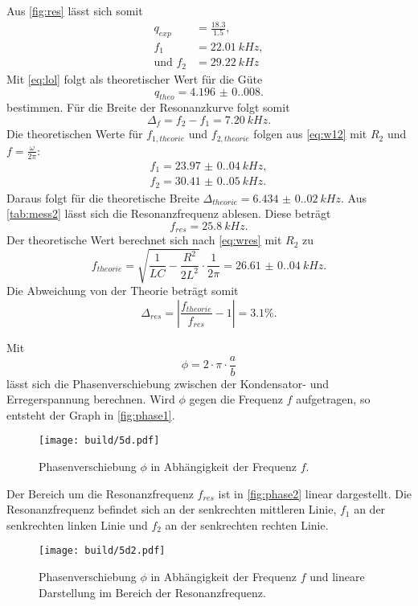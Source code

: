 Aus \autoref{fig:res} lässt sich somit
\begin{align*}
  q_{exp} &= \frac{18.3}{1.5}, \\
  f_1 &= \SI{22.01}{kHz}, \\
  \text{und } f_2 &= \SI{29.22}{kHz}
\end{align*}
Mit \autoref{eq:lol} folgt als theoretischer Wert für die Güte
\begin{equation*}
  q_{theo} = \SI{4.196(0.008)}.
\end{equation*}
bestimmen. Für die Breite der Resonanzkurve folgt somit
\begin{equation*}
  \Delta_f = f_2 - f_1 = \SI{7.20}{kHz}.
\end{equation*}
\newpage
Die theoretischen Werte für $f_{1, theorie}$ und $f_{2, theorie}$ folgen aus \autoref{eq:w12} mit $R_2$ und $f = \frac{\omega}{2\pi}$:
\begin{align*}
  f_1 = \SI{23.97(0.04)}{kHz},\\
  f_2 = \SI{30.41(0.05)}{kHz}.
\end{align*}
Daraus folgt für die theoretische Breite $\Delta_{theorie} = \SI{6.434(0.020)}{kHz}$.
Aus \autoref{tab:mess2} lässt sich die Resonanzfrequenz ablesen. Diese beträgt
\begin{equation*}
  f_{res} = \SI{25.8}{kHz}.
\end{equation*}
Der theoretische Wert berechnet sich nach \autoref{eq:wres} mit $R_2$ zu 
\begin{equation*}
  f_{theorie} = \sqrt{\frac{1}{LC} - \frac{R^2}{2L^2}} \cdot \frac{1}{2\pi} = \SI{26.61(0.04)}{kHz}.
\end{equation*}
Die Abweichung von der Theorie beträgt somit 
\begin{equation*}
  \Delta_{res} = |\frac{f_{theorie}}{f_{res}} - 1| = 3.1\%.
\end{equation*}

Mit 
\begin{equation*}
  \phi = 2 \cdot \pi \cdot \frac{a}{b}
\end{equation*}
lässt sich die Phasenverschiebung zwischen der Kondensator- und Erregerspannung berechnen.
Wird $\phi$ gegen die Frequenz $f$ aufgetragen, so entsteht der Graph in \autoref{fig:phase1}.
\begin{figure}[H]
  \texttt{[image: build/5d.pdf]}
  \caption{Phasenverschiebung $\phi$ in Abhängigkeit der Frequenz $f$.}
  \label{fig:phase1}
\end{figure}
Der Bereich um die Resonanzfrequenz $f_{res}$ ist in \autoref{fig:phase2} linear dargestellt. Die Resonanzfrequenz befindet sich an der senkrechten
mittleren Linie, $f_1$ an der senkrechten linken Linie und $f_2$ an der senkrechten rechten Linie.
\begin{figure}[H]
  \texttt{[image: build/5d2.pdf]}
  \caption{Phasenverschiebung $\phi$ in Abhängigkeit der Frequenz $f$ und lineare Darstellung im Bereich der Resonanzfrequenz.}
  \label{fig:phase2}
\end{figure}







\newpage

